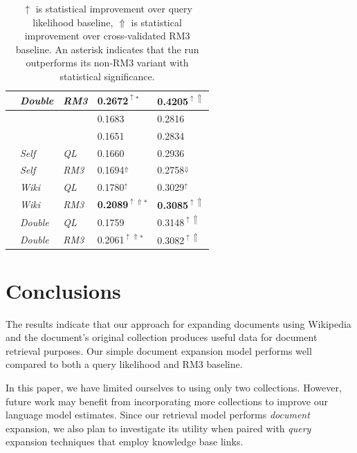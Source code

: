 \documentclass{article}
\begin{document}
\begin{table}[htbp]
\begin{tabular}{|c|l|l|l|l|}
\rule{0pt}{2.5ex} & {\it Double} & {\it RM3} & 0.2672$^{\uparrow *}$ & \textbf{0.4205}$^{\uparrow\Uparrow}$ \\ \hline\hline
\rule{0pt}{2.5ex} \multirow{7}{*}{wt10g} & \cellcolor{gray!50}{\it Baseline} & \cellcolor{gray!50}{\it QL} & \cellcolor{gray!50}0.1683 & \cellcolor{gray!50}0.2816 \\ \cline{2-5}
\rule{0pt}{2.5ex} & \cellcolor{gray!50}{\it Baseline} & \cellcolor{gray!50}{\it RM3} & \cellcolor{gray!50}0.1651 & \cellcolor{gray!50}0.2834 \\ \cline{2-5}
\rule{0pt}{2.5ex} & {\it Self} & {\it QL} & 0.1660 & 0.2936 \\ \cline{2-5}
\rule{0pt}{2.5ex} & {\it Self} & {\it RM3} & 0.1694$^\Uparrow$ & 0.2758$^\Downarrow$ \\ \cline{2-5}
\rule{0pt}{2.5ex} & {\it Wiki} & {\it QL} & 0.1780$^\uparrow$ & 0.3029$^\uparrow$ \\ \cline{2-5}
\rule{0pt}{2.5ex} & {\it Wiki} & {\it RM3} & \textbf{0.2089}$^{\uparrow\Uparrow *}$ & \textbf{0.3085}$^{\uparrow\Uparrow}$ \\ \cline{2-5}
\rule{0pt}{2.5ex} & {\it Double} & {\it QL} & 0.1759 & 0.3148$^{\uparrow\Uparrow}$ \\ \cline{2-5}
\rule{0pt}{2.5ex} & {\it Double} & {\it RM3} & 0.2061$^{\uparrow\Uparrow *}$ & 0.3082$^{\uparrow\Uparrow}$ \\ \hline
\end{tabular}
\caption{$\uparrow$ is statistical improvement over query likelihood baseline, $\Uparrow$ is statistical improvement over cross-validated RM3 baseline. An asterisk indicates that the run outperforms its non-RM3 variant with statistical significance.}
\label{table.performance}
\end{table}

\section{Conclusions}\label{section.conclusions}

The results indicate that our approach for expanding documents using Wikipedia and the document's original collection produces useful data for document retrieval purposes. Our simple document expansion model performs well compared to both a query likelihood and RM3 baseline.

In this paper, we have limited ourselves to using only two collections. However, future work may benefit from incorporating more collections to improve our language model estimates. Since our retrieval model performs \textit{document} expansion, we also plan to investigate its utility when paired with \textit{query} expansion techniques that employ knowledge base links.
\end{document}
